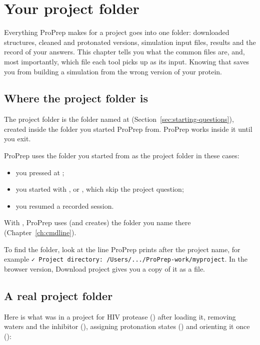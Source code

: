 \chapter{Your project folder}\label{ch:projectfolder}

Everything ProPrep makes for a project goes into one folder: downloaded
structures, cleaned and protonated versions, simulation input files, results
and the record of your answers. This chapter tells you what the common files
are, and, most importantly, which file each tool picks up as its input. Knowing
that saves you from building a simulation from the wrong version of your
protein.

\section{Where the project folder is}\label{sec:projectfolder-where}

The project folder is the folder named at 
(Section~\ref{sec:starting-questions}), created inside the folder you started
ProPrep from. ProPrep works inside it until you exit.

ProPrep uses the folder you started from as the project folder in these cases:
\begin{itemize}
  \item you pressed  at ;
  \item you started with ,  or
  , which skip the project question;
  \item you resumed a recorded session.
\end{itemize}
With , ProPrep uses (and creates) the folder you name
there (Chapter~\ref{ch:cmdline}).

\begin{tip}
To find the folder, look at the line ProPrep prints after the project name, for
example \texttt{✓ Project directory: /Users/.../ProPrep-work/myproject}. In the
browser version, \textsf{Download project} gives you a copy of it as a
 file.
\end{tip}

\section{A real project folder}\label{sec:projectfolder-example}

Here is what was in a project for HIV protease () after loading it,
removing waters and the inhibitor (), assigning protonation states
() and orienting it once ():

